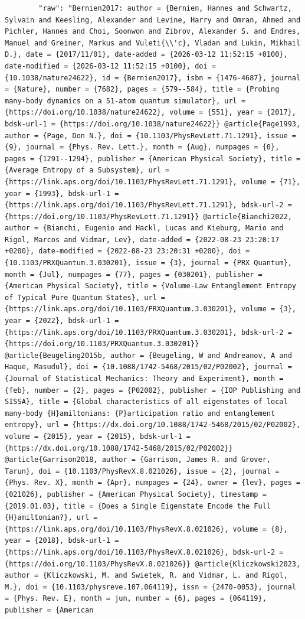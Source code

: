 \documentclass[11pt]{article}
\begin{document}
\begin{verbatim}
        "raw": "Bernien2017: author = {Bernien, Hannes and Schwartz, Sylvain and Keesling, Alexander and Levine, Harry and Omran, Ahmed and Pichler, Hannes and Choi, Soonwon and Zibrov, Alexander S. and Endres, Manuel and Greiner, Markus and Vuleti{\\'c}, Vladan and Lukin, Mikhail D.}, date = {2017/11/01}, date-added = {2026-03-12 11:52:15 +0100}, date-modified = {2026-03-12 11:52:15 +0100}, doi = {10.1038/nature24622}, id = {Bernien2017}, isbn = {1476-4687}, journal = {Nature}, number = {7682}, pages = {579--584}, title = {Probing many-body dynamics on a 51-atom quantum simulator}, url = {https://doi.org/10.1038/nature24622}, volume = {551}, year = {2017}, bdsk-url-1 = {https://doi.org/10.1038/nature24622}} @article{Page1993, author = {Page, Don N.}, doi = {10.1103/PhysRevLett.71.1291}, issue = {9}, journal = {Phys. Rev. Lett.}, month = {Aug}, numpages = {0}, pages = {1291--1294}, publisher = {American Physical Society}, title = {Average Entropy of a Subsystem}, url = {https://link.aps.org/doi/10.1103/PhysRevLett.71.1291}, volume = {71}, year = {1993}, bdsk-url-1 = {https://link.aps.org/doi/10.1103/PhysRevLett.71.1291}, bdsk-url-2 = {https://doi.org/10.1103/PhysRevLett.71.1291}} @article{Bianchi2022, author = {Bianchi, Eugenio and Hackl, Lucas and Kieburg, Mario and Rigol, Marcos and Vidmar, Lev}, date-added = {2022-08-23 23:20:17 +0200}, date-modified = {2022-08-23 23:20:31 +0200}, doi = {10.1103/PRXQuantum.3.030201}, issue = {3}, journal = {PRX Quantum}, month = {Jul}, numpages = {77}, pages = {030201}, publisher = {American Physical Society}, title = {Volume-Law Entanglement Entropy of Typical Pure Quantum States}, url = {https://link.aps.org/doi/10.1103/PRXQuantum.3.030201}, volume = {3}, year = {2022}, bdsk-url-1 = {https://link.aps.org/doi/10.1103/PRXQuantum.3.030201}, bdsk-url-2 = {https://doi.org/10.1103/PRXQuantum.3.030201}} @article{Beugeling2015b, author = {Beugeling, W and Andreanov, A and Haque, Masudul}, doi = {10.1088/1742-5468/2015/02/P02002}, journal = {Journal of Statistical Mechanics: Theory and Experiment}, month = {feb}, number = {2}, pages = {P02002}, publisher = {IOP Publishing and SISSA}, title = {Global characteristics of all eigenstates of local many-body {H}amiltonians: {P}articipation ratio and entanglement entropy}, url = {https://dx.doi.org/10.1088/1742-5468/2015/02/P02002}, volume = {2015}, year = {2015}, bdsk-url-1 = {https://dx.doi.org/10.1088/1742-5468/2015/02/P02002}} @article{Garrison2018, author = {Garrison, James R. and Grover, Tarun}, doi = {10.1103/PhysRevX.8.021026}, issue = {2}, journal = {Phys. Rev. X}, month = {Apr}, numpages = {24}, owner = {lev}, pages = {021026}, publisher = {American Physical Society}, timestamp = {2019.01.03}, title = {Does a Single Eigenstate Encode the Full {H}amiltonian?}, url = {https://link.aps.org/doi/10.1103/PhysRevX.8.021026}, volume = {8}, year = {2018}, bdsk-url-1 = {https://link.aps.org/doi/10.1103/PhysRevX.8.021026}, bdsk-url-2 = {https://doi.org/10.1103/PhysRevX.8.021026}} @article{Kliczkowski2023, author = {Kliczkowski, M. and Swietek, R. and Vidmar, L. and Rigol, M.}, doi = {10.1103/physreve.107.064119}, issn = {2470-0053}, journal = {Phys. Rev. E}, month = jun, number = {6}, pages = {064119}, publisher = {American 
\end{verbatim}
\end{document}
